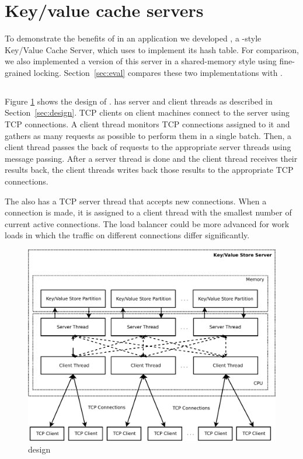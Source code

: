 \section{Key/value cache servers}
\label{sec:server}

To demonstrate the benefits of \cphash{} in an application we developed
\cpserver{}, a \memcached{}-style Key/Value Cache Server, which uses \cphash{} to
implement its hash table.  For comparison, we also implemented a version of this
server in a shared-memory style using fine-grained locking.
Section~\ref{sec:eval} compares these two implementations with \memcached{}.

\subsection{{\cpserver}{}}

Figure \ref{fig:mcserver} shows the design of \cpserver{}.  \cpserver{} has
server and client threads as described in Section~\ref{sec:design}. TCP clients
on client machines connect to the server using TCP connections.  A client thread
monitors TCP connections assigned to it and gathers as many requests as possible
to perform them in a single batch. Then, a client thread passes the back of
requests to the appropriate server threads using message passing. After a server
thread is done and the client thread receives their results back, the client
threads writes back those results to the appropriate TCP connections.

The \cpserver{} also has a TCP server thread that accepts new connections. When
a connection is made, it is assigned to a client thread with the smallest number
of current active connections.  The load balancer could be more advanced for
work loads in which the traffic on different connections differ significantly.

\begin{figure}[!ht]
  \centering
  \includegraphics[width=\linewidth]{figs/mcserver.pdf}
  \caption{\cpserver{} design}
  \label{fig:mcserver}
\end{figure}

